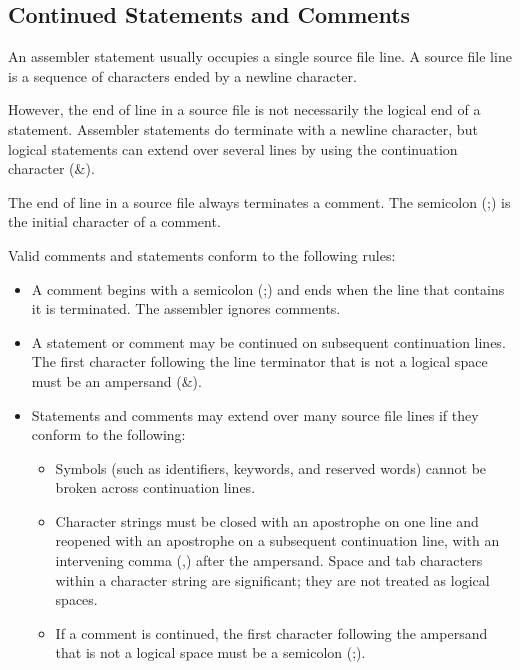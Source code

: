 \subsection*{Continued Statements and Comments}
An assembler statement usually occupies a single source file line. A source file line is a sequence of characters ended by a newline character.

However, the end of line in a source file is not necessarily the logical end of a statement. Assembler statements do terminate with a newline character, but logical statements can extend over several lines by using the continuation character (\&).

The end of line in a source file always terminates a comment. The semicolon (;) is the initial character of a comment.

Valid comments and statements conform to the following rules:
\begin{itemize}
\item A comment begins with a semicolon (;) and ends when the line that contains it is terminated. The assembler ignores comments.
\item A statement or comment may be continued on subsequent continuation lines. The first character following the line terminator that is not a logical space must be an ampersand (\&).
\item Statements and comments may extend over many source file lines if they conform to the following:
\begin{itemize}
\item Symbols (such as identifiers, keywords, and reserved words) cannot be broken across continuation lines.
\item Character strings must be closed with an apostrophe on one line and reopened with an apostrophe on a subsequent continuation line, with an intervening comma (,) after the ampersand. Space and tab characters within a character string are significant; they are not treated as logical spaces.
\item If a comment is continued, the first character following the ampersand that is not a logical space must be a semicolon (;).
\end{itemize}
\end{itemize}

